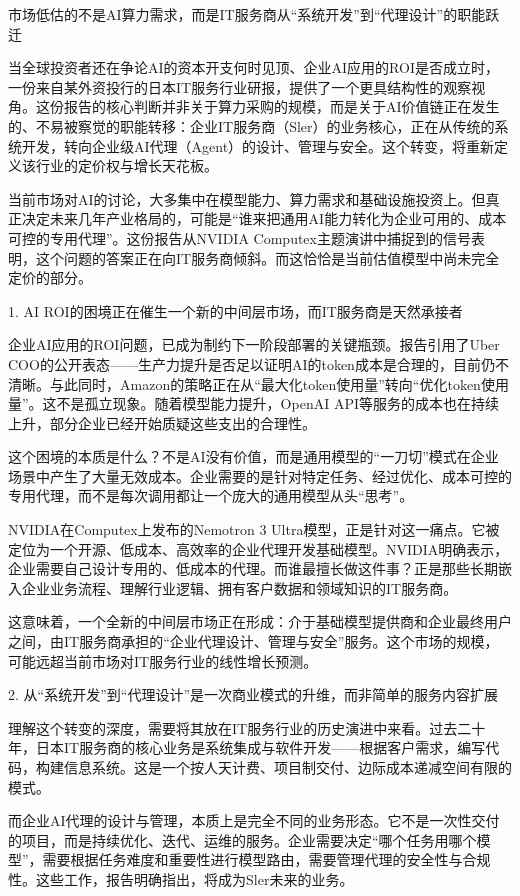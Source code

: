 \documentclass[11pt]{ctexart}
\begin{document}
市场低估的不是AI算力需求，而是IT服务商从“系统开发”到“代理设计”的职能跃迁

当全球投资者还在争论AI的资本开支何时见顶、企业AI应用的ROI是否成立时，一份来自某外资投行的日本IT服务行业研报，提供了一个更具结构性的观察视角。这份报告的核心判断并非关于算力采购的规模，而是关于AI价值链正在发生的、不易被察觉的职能转移：企业IT服务商（Sler）的业务核心，正在从传统的系统开发，转向企业级AI代理（Agent）的设计、管理与安全。这个转变，将重新定义该行业的定价权与增长天花板。

当前市场对AI的讨论，大多集中在模型能力、算力需求和基础设施投资上。但真正决定未来几年产业格局的，可能是“谁来把通用AI能力转化为企业可用的、成本可控的专用代理”。这份报告从NVIDIA Computex主题演讲中捕捉到的信号表明，这个问题的答案正在向IT服务商倾斜。而这恰恰是当前估值模型中尚未完全定价的部分。

1. AI ROI的困境正在催生一个新的中间层市场，而IT服务商是天然承接者

企业AI应用的ROI问题，已成为制约下一阶段部署的关键瓶颈。报告引用了Uber COO的公开表态——生产力提升是否足以证明AI的token成本是合理的，目前仍不清晰。与此同时，Amazon的策略正在从“最大化token使用量”转向“优化token使用量”。这不是孤立现象。随着模型能力提升，OpenAI API等服务的成本也在持续上升，部分企业已经开始质疑这些支出的合理性。

这个困境的本质是什么？不是AI没有价值，而是通用模型的“一刀切”模式在企业场景中产生了大量无效成本。企业需要的是针对特定任务、经过优化、成本可控的专用代理，而不是每次调用都让一个庞大的通用模型从头“思考”。

NVIDIA在Computex上发布的Nemotron 3 Ultra模型，正是针对这一痛点。它被定位为一个开源、低成本、高效率的企业代理开发基础模型。NVIDIA明确表示，企业需要自己设计专用的、低成本的代理。而谁最擅长做这件事？正是那些长期嵌入企业业务流程、理解行业逻辑、拥有客户数据和领域知识的IT服务商。

这意味着，一个全新的中间层市场正在形成：介于基础模型提供商和企业最终用户之间，由IT服务商承担的“企业代理设计、管理与安全”服务。这个市场的规模，可能远超当前市场对IT服务行业的线性增长预测。

2. 从“系统开发”到“代理设计”是一次商业模式的升维，而非简单的服务内容扩展

理解这个转变的深度，需要将其放在IT服务行业的历史演进中来看。过去二十年，日本IT服务商的核心业务是系统集成与软件开发——根据客户需求，编写代码，构建信息系统。这是一个按人天计费、项目制交付、边际成本递减空间有限的模式。

而企业AI代理的设计与管理，本质上是完全不同的业务形态。它不是一次性交付的项目，而是持续优化、迭代、运维的服务。企业需要决定“哪个任务用哪个模型”，需要根据任务难度和重要性进行模型路由，需要管理代理的安全性与合规性。这些工作，报告明确指出，将成为Sler未来的业务。
\end{document}
